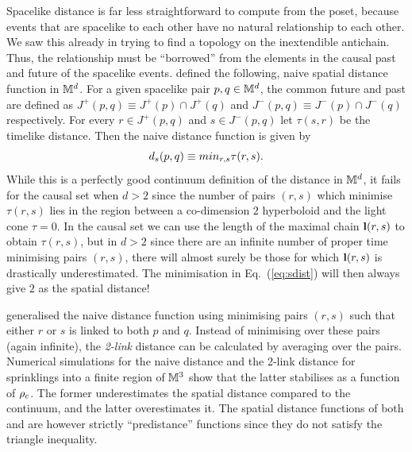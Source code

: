 Spacelike distance is far less straightforward to compute from the
poset, because events that are spacelike to each other have no natural
relationship to each other. We saw this already in trying to find a topology on the inextendible
antichain. Thus, the relationship must be ``borrowed'' from the
elements in the causal past and future of the spacelike events.  \cite{bg} defined the following,  naive spatial distance function in
$\mathbb M^d$. For a given spacelike pair $p,q \in \mathbb M^d$, the 
{common future and past} are defined as 
$ J^+(p,q)\equiv J^+(p) \cap J^+(q)$ and  $ J^-(p,q)\equiv J^-(p) \cap J^-(q)$ respectively. For  every $r \in  J^+(p,q) $ and
$ s  \in J^-(p,q) $ let $\tau(s,r)$ be the timelike distance. Then the  naive distance function is given by 
\begin{equation} 
\label{eq:sdist} 
d_s(p,q) \equiv min_ {r,s} \tau(r,s). 
\end{equation} 
While this is a perfectly good continuum definition of the distance in $\mathbb M^d$, it fails for the causal set when $d>2$
since the number of pairs $(r,s)$ which minimise $\tau(r,s)$ lies  in the region between a co-dimension $2$ hyperboloid
and the light cone $\tau=0$.  In the causal set we
can use the length of the maximal chain $\mathbf l(r,s)$ to obtain $\tau(r,s)$, but in $d>2$ since there are an infinite
number of proper time minimising pairs $(r,s)$, there will almost surely be those for which $\mathbf l(r,s)$ is drastically
underestimated. The minimisation in Eq.~(\ref{eq:sdist}) will then always give $2$ as the spatial distance!

\cite{rw}  generalised  the naive distance function using minimising pairs $(r,s)$ such that either $r$ or $s$ is
linked to both $p$ and $q$.  Instead of minimising over these pairs (again infinite), the \emph{2-link} distance can be 
calculated by averaging over the pairs. Numerical simulations for the naive distance and the 2-link distance for sprinklings
into a finite region of $\mathbb M^3$ show that the latter stabilises as a function of $\rho_c$. The former underestimates the
spatial distance compared to the continuum, and the latter overestimates it. The spatial distance functions of both \cite{bg}
and \cite{rw} are however strictly
``predistance'' functions since they do not satisfy the triangle inequality.  


